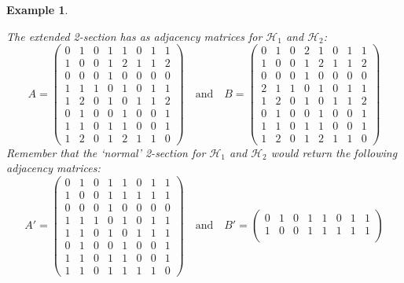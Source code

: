 \documentclass[a4paper,11pt]{report}
\newtheorem{example}[theorem]{Example}
\newcommand{\hgrafeen}{\mathcal{H}}
\begin{document}
\begin{example}
\begin{center}
\end{center}
The extended 2-section has as adjacency matrices for $\hgrafeen_1$ and $\hgrafeen_2$:
$$A = \begin{pmatrix}
0&1&0&1&1&0&1&1\\
1&0&0&1&2&1&1&2\\
0&0&0&1&0&0&0&0\\
1&1&1&0&1&0&1&1\\
1&2&0&1&0&1&1&2\\
0&1&0&0&1&0&0&1\\
1&1&0&1&1&0&0&1\\
1&2&0&1&2&1&1&0
\end{pmatrix} \quad \text{and} \quad B = \begin{pmatrix}
 0& 1& 0& 2& 1& 0& 1& 1\\
 1& 0& 0& 1& 2& 1& 1& 2\\
 0& 0& 0& 1& 0& 0& 0& 0\\
 2& 1& 1& 0& 1& 0& 1& 1\\
 1& 2& 0& 1& 0& 1& 1& 2\\
 0& 1& 0& 0& 1& 0& 0& 1\\
 1& 1& 0& 1& 1& 0& 0& 1\\
 1& 2& 0& 1& 2& 1& 1& 0
\end{pmatrix}$$
Remember that the `normal' 2-section for $\hgrafeen_1$ and $\hgrafeen_2$ would return the following
adjacency matrices: 
$$
A' = \begin{pmatrix}
0&1&0&1&1&0&1&1\\
1&0&0&1&1&1&1&1\\
0&0&0&1&0&0&0&0\\
1&1&1&0&1&0&1&1\\
1&1&0&1&0&1&1&1\\
0&1&0&0&1&0&0&1\\
1&1&0&1&1&0&0&1\\
1&1&0&1&1&1&1&0
\end{pmatrix} \quad \text{and} \quad
B' = \begin{pmatrix}
 0& 1& 0& 1& 1& 0& 1& 1\\
 1& 0& 0& 1& 1& 1& 1& 1\\

\end{pmatrix}$$
\end{example}
\end{document}
